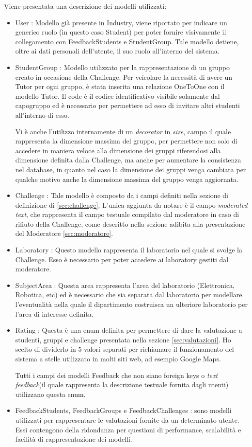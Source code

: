 Viene presentata una descrizione dei modelli utilizzati:
\begin{itemize}
    \item User : Modello già presente in Industry, viene riportato per indicare un generico ruolo (in questo caso Student) per poter fornire visivamente il collegamento con FeedbackStudents e StudentGroup. Tale modello detiene, oltre ai dati personali dell'utente, il suo ruolo all'interno del sistema. 
    \item StudentGroup : Modello utilizzato per la rappresentazione di un gruppo creato in occasione della Challenge. Per veicolare la necessità di avere un Tutor per ogni gruppo, è stata inserita una relazione OneToOne con il modello Tutor. Il code è il codice identificativo visibile solamente dal capogruppo ed è necessario per permettere ad esso di invitare altri studenti all'interno di esso.

        Vi è anche l'utilizzo internamente di un \textit{decorator} in \textit{size}, campo il quale rappresenta la dimensione massima del gruppo, per permettere non solo di accedere in maniera veloce alla dimensione dei gruppi riferendosi alla dimensione definita dalla Challenge, ma anche per aumentare la consistenza nel database, in quanto nel caso la dimensione dei gruppi venga cambiata per qualche motivo anche la dimensione massima del gruppo venga aggiornata.
    \item Challenge : Tale modello è composto da i campi definiti nella sezione di definizione di \ref{sec:challenge}. L'unica aggiunta da notare è il campo \textit{moderated text}, che rappresenta il campo testuale compilato dal moderatore in caso di rifiuto della Challenge, come descritto nella sezione adibita alla presentazione del Moderatore \ref{sec:moderatore}.
    \item Laboratory : Questo modello rappresenta il laboratorio nel quale si svolge la Challenge. Esso è necessario per poter accedere ai laboratory gestiti dal moderatore. 
    \item SubjectArea : Questa area rappresenta l'area del laboratorio (Elettronica, Robotica, etc) ed è necessario che sia separata dal laboratorio per modellare l'eventualità nella quale il dipartimento costruisca un ulteriore laboratorio per l'area di interesse definita. 
    \item Rating : Questa è una enum definita per permettere di dare la valutazione a studenti, gruppi e challenge presentata nella sezione \ref{sec:valutazioni}. Ho scelto di dividerlo in 5 valori separati per richiamare il funzionamento del sistema a stelle utilizzato in molti siti web, ad esempio Google Maps.

        Tutti i campi dei modelli Feedback che non siano foreign keys o \textit{text feedback}(il quale rappresenta la descrizione testuale fornita dagli utenti) utilizzano questa enum.
    \item FeedbackStudents, FeedbackGroups e FeedbackChallenges : sono modelli utilizzati per rappresentare le valutazioni fornite da un determinato utente. Essi contengono della ridondanza per questioni di performance, scalabilità e facilità di rappresentazione dei modelli.

\end{itemize}



\clearpage
